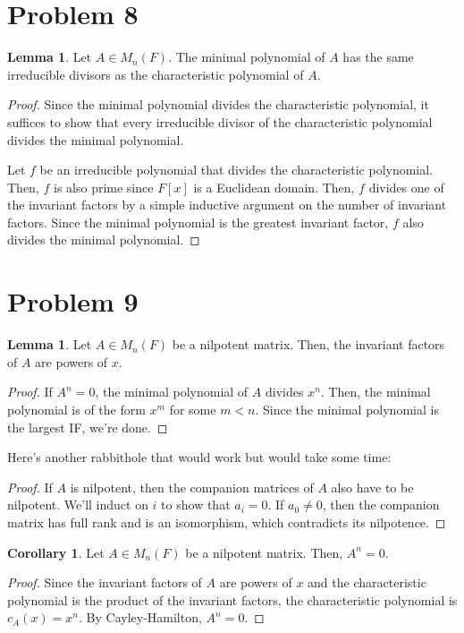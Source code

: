 \documentclass{article}
\theoremstyle{definition}
\newtheorem{lemma}[theorem]{Lemma}
\newtheorem{corollary}{Corollary}[theorem]
\begin{document}
\section{Problem 8}

\begin{lemma}
    Let $A \in M_{n}(F)$. The minimal polynomial of $A$ has the same irreducible divisors
    as the characteristic polynomial of $A$.
\end{lemma}
\begin{proof}
    Since the minimal polynomial divides the characteristic polynomial, it suffices to show
    that every irreducible divisor of the characteristic polynomial divides the minimal polynomial.

    Let $f $ be an irreducible polynomial that divides the characteristic polynomial. Then, $f$ is
    also prime since $F[x]$ is a Euclidean domain. Then, $f$ divides one of the invariant factors by
    a simple inductive argument on the number of invariant factors. Since the minimal polynomial is
    the greatest invariant factor, $f$ also divides the minimal polynomial.
\end{proof}

\section{Problem 9}

\begin{lemma}
    Let $A \in M_{n}(F)$ be a nilpotent matrix. Then, the invariant factors of $A$
    are powers of $x$.
\end{lemma}
\begin{proof}
    If $A^{n} = 0$, the minimal polynomial of $A$ divides $x^{n}$. Then, the minimal
    polynomial is of the form $x^{m}$ for some $m < n$. Since the minimal polynomial
    is the largest IF, we're done. 
\end{proof}

Here's another rabbithole that would work but would take some time:

\begin{proof}
    If $A$ is nilpotent, then the companion matrices of $A$ also have to be nilpotent. We'll induct on $i$
    to show that $a_{i} = 0$. If $a_{0} \neq 0$, then the companion matrix has full rank and is an isomorphism,
    which contradicts its nilpotence.
\end{proof}

\begin{corollary}
    Let $A \in M_{n}(F)$ be a nilpotent matrix. Then, $A^{n} = 0$.
\end{corollary}
\begin{proof}
    Since the invariant factors of $A$ are powers of $x$ and the characteristic polynomial is the product
    of the invariant factors, the characteristic polynomial is $c_{A}(x) = x^{n}$. By Cayley-Hamilton, 
    $A^{n} = 0$.
\end{proof}
\end{document}
